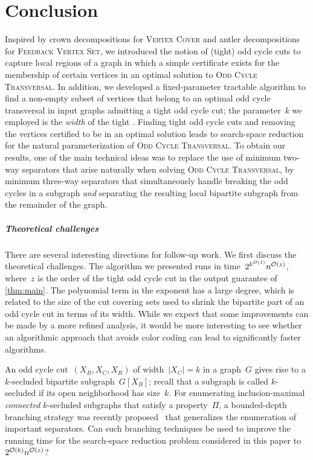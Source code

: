 \section{Conclusion} \label{sec:conclusion}

Inspired by crown decompositions for \textsc{Vertex Cover} and antler decompositions for \textsc{Feedback Vertex Set}, we introduced the notion of (tight) odd cycle cuts to capture local regions of a graph in which a simple certificate exists for the membership of certain vertices in an optimal solution to \textsc{Odd Cycle Transversal}. In addition, we developed a fixed-parameter tractable algorithm to find a non-empty subset of vertices that belong to an optimal odd cycle transversal in input graphs admitting a tight odd cycle cut; the parameter~$k$ we employed is the \emph{width} of the tight \occ. Finding tight odd cycle cuts and removing the vertices certified to be in an 	optimal solution leads to search-space reduction for the natural parameterization of \textsc{Odd Cycle Transversal}. To obtain our results, one of the main technical ideas was to replace the use of minimum two-way separators that arise naturally when solving \textsc{Odd Cycle Transversal}, by minimum three-way separators that simultaneously handle breaking the odd cycles in a subgraph \emph{and} separating the resulting local bipartite subgraph from the remainder of the graph.

\subparagraph*{Theoretical challenges}
There are several interesting directions for follow-up work. We first discuss the theoretical challenges. The algorithm we presented runs in time~$2^{k^{\mathcal{O}(1)}} n^{\mathcal{O}(z)}$, where~$z$ is the order of the tight odd cycle cut in the output guarantee of \cref{thm:main}. The polynomial term in the exponent has a large degree, which is related to the size of the cut covering sets used to shrink the bipartite part of an odd cycle cut in terms of its width. While we expect that some improvements can be made by a more refined analysis, it would be more interesting to see whether an algorithmic approach that avoids color coding can lead to significantly faster algorithms. 

An odd cycle cut~$(X_B, X_C, X_R)$ of width~$|X_C| = k$ in a graph~$G$ gives rise to a $k$-secluded bipartite subgraph~$G[X_B]$; recall that a subgraph is called $k$-secluded if its open neighborhood has size~$k$. For enumerating inclusion-maximal \emph{connected} $k$-secluded subgraphs that satisfy a property~$\Pi$, a bounded-depth branching strategy was recently proposed~\cite{JansenKW23} that generalizes the enumeration of important separators. Can such branching techniques be used to improve the running time for the search-space reduction problem considered in this paper to~$2^{\mathcal{O}(k)} n^{\mathcal{O}(z)}$?

